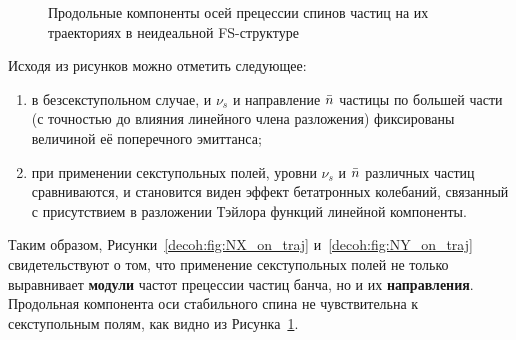 \begin{figure}[H]
	\centering
	\hfill
	\hfill
	\caption{Продольные компоненты осей прецессии спинов частиц на их траекториях в неидеальной FS-структуре\label{decoh:fig:NZ_on_traj}}
\end{figure}

Исходя из рисунков можно отметить следующее:
\begin{enumerate}
	\item в безсекступольном случае, и $\nu_s$ и направление $\bar n$ частицы по большей части (с точностью до влияния линейного члена разложения) фиксированы величиной её поперечного эмиттанса;
	\item при применении секступольных полей, уровни $\nu_s$ и $\bar n$ различных частиц сравниваются, 
	и становится виден эффект бетатронных колебаний, связанный с присутствием 
	в разложении Тэйлора функций линейной компоненты.
\end{enumerate}
Таким образом, Рисунки~\ref{decoh:fig:NX_on_traj} и~\ref{decoh:fig:NY_on_traj} свидетельствуют о том, 
что применение секступольных полей не только выравнивает \textbf{модули} частот прецессии частиц банча, 
но и их \textbf{направления}. Продольная компонента оси стабильного спина не чувствительна 
к секступольным полям, как видно из Рисунка~\ref{decoh:fig:NZ_on_traj}.

